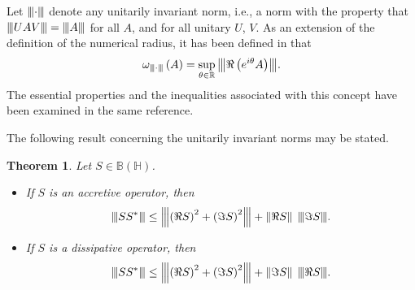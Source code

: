 \documentclass[12pt,twoside,reqno]{amsart}
\newcommand{\vertiii}[1]{{\left\vert\kern-0.25ex\left\vert\kern-0.25ex\left\vert #1 
    \right\vert\kern-0.25ex\right\vert\kern-0.25ex\right\vert}}
\newtheorem{theorem}{Theorem}[section]
\numberwithin{equation}{section}
\begin{document}
Let $\vertiii{ \cdot }$ denote any unitarily invariant norm, i.e., a norm with the property that $\vertiii{ UAV }=\vertiii{ A }$ for all $A$, and for all unitary $U$, $V$.
As an extension of the definition of the numerical radius, it has been defined in \cite{Abu-Omar} that 
\begin{equation}\label{23}
{{\omega }_{\vertiii{ \cdot }}}\left( A \right)=\underset{\theta \in \mathbb{R}}{\mathop{\sup }}\,\vertiii{ \Re\left( {{e}^{i\theta }}A \right) }.
\end{equation}
The essential properties and the inequalities associated with this concept have been examined in the same reference.







The following result concerning the unitarily invariant norms may be stated.
\begin{theorem}\label{25}
Let $S\in \mathbb B\left( \mathbb H \right)$.
\begin{itemize}
\item If $S$ is an accretive operator, then
\begin{equation}\label{26}
{{\vertiii{ S{{S}^{*}} }}}\le {{\vertiii{ {{\left( \Re S \right)}^{2}}+{{\left( \Im S \right)}^{2}} }}}+\left\| \Re S \right\|\;{{\vertiii{ \Im S }}}.
\end{equation}
\item If $S$ is a dissipative operator, then
\[{{\vertiii{ S{{S}^{*}} }}}\le {{\vertiii{ {{\left( \Re S \right)}^{2}}+{{\left( \Im S \right)}^{2}} }}}+\left\| \Im S \right\|\;{{\vertiii{ \Re S }}}.\]
\end{itemize}
\end{theorem}
\end{document}
